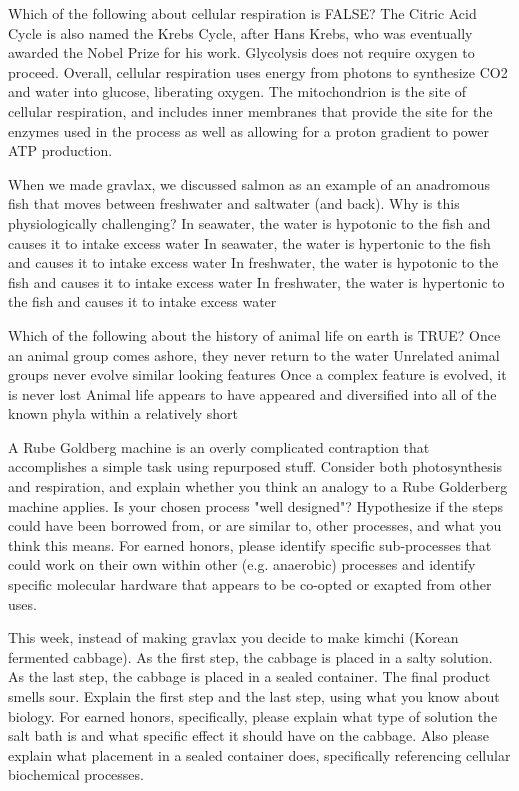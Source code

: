 Which of the following about cellular respiration is FALSE? 
The Citric Acid Cycle is also named the Krebs Cycle, after Hans Krebs, who was eventually awarded the Nobel Prize for his work. 
Glycolysis does not require oxygen to proceed. 
Overall, cellular respiration uses energy from photons to synthesize CO2 and water into glucose, liberating oxygen. 
The mitochondrion is the site of cellular respiration, and includes inner membranes that provide the site for the enzymes used in the process as well as allowing for a proton gradient to power ATP production. 





When we made gravlax, we discussed salmon as an example of an anadromous fish that moves between freshwater and saltwater (and back). Why is this physiologically challenging? 
In seawater, the water is hypotonic to the fish and causes it to intake excess water
In seawater, the water is hypertonic to the fish and causes it to intake excess water
In freshwater, the water is hypotonic to the fish and causes it to intake excess water
In freshwater, the water is hypertonic to the fish and causes it to intake excess water





Which of the following about the history of animal life on earth is TRUE? 
Once an animal group comes ashore, they never return to the water
Unrelated animal groups never evolve similar looking features
Once a complex feature is evolved, it is never lost
Animal life appears to have appeared and diversified into all of the known phyla within a relatively short 




A Rube Goldberg machine is an overly complicated contraption that accomplishes a simple task using repurposed stuff. Consider both photosynthesis and respiration, and explain whether you think an analogy to a Rube Golderberg machine applies. Is your chosen process "well designed"? Hypothesize if the steps could have been borrowed from, or are similar to, other processes, and what you think this means.  For earned honors, please identify specific sub-processes that could work on their own within other (e.g. anaerobic) processes and identify specific molecular hardware that appears to be co-opted or exapted from other uses. 

This week, instead of making gravlax you decide to make kimchi (Korean fermented cabbage). As the first step, the cabbage is placed in a salty solution. As the last step, the cabbage is placed in a sealed container. The final product smells sour. Explain the first step and the last step, using what you know about biology. For earned honors, specifically, please explain what type of solution the salt bath is and what specific effect it should have on the cabbage. Also please explain what placement in a sealed container does, specifically referencing cellular biochemical processes. 

